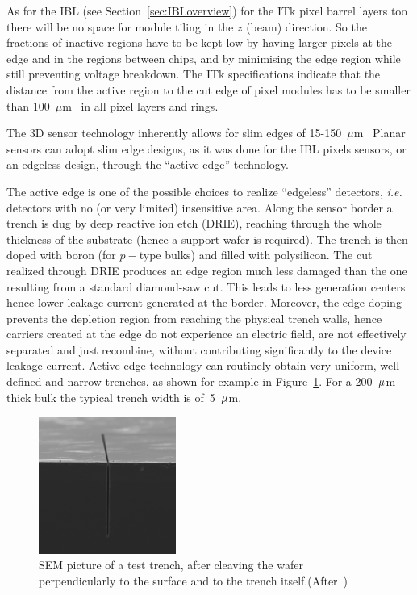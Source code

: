 As for the IBL (see Section~\ref{sec:IBLoverview}) for the ITk pixel barrel layers too there will be no 
space for module tiling in the $z$ (beam) direction. So the fractions of inactive regions have to be kept 
low by having larger pixels at the edge and in the regions between chips, and by minimising the edge 
region while still preventing voltage breakdown. 
 The ITk specifications indicate that the distance from the active region to the cut edge of pixel modules has to be smaller than 100~$\mu$m~\cite{ITkStripsTDR} in all pixel layers and rings.



The 3D sensor technology inherently allows for slim edges of 15-150~$\mu$m~\cite{1748-0221-10-03-C03031} 
Planar sensors can adopt slim edge designs, as it was done for the IBL pixels sensors, or 
an edgeless design, through the ``active edge'' technology.


The active edge is one of the possible choices to realize ``edgeless'' detectors, {\it i.e.} detectors with no (or very limited) insensitive area. Along the sensor border a trench is dug by deep reactive ion etch (DRIE), reaching through the whole thickness of the substrate (hence a support wafer is required).  The  trench is then doped with boron (for $p-$type bulks) and  filled with polysilicon. The cut realized through DRIE produces an edge region
much less damaged than the one resulting from a standard diamond-saw cut. This leads to less generation centers hence lower leakage current generated at the border. Moreover, the edge doping prevents the depletion region from reaching the physical trench walls, hence carriers created at the edge  do not experience an electric field, are not effectively separated and just recombine, without contributing significantly to the device leakage current.
Active edge technology can routinely obtain very uniform, well defined and narrow trenches, as shown for example in Figure~\ref{fig:trench}. For a 200~${\rm \mu}$m thick bulk the typical trench width is of~5~${\rm \mu}$m.

\begin{figure}[!htpb]
\begin{center}
\includegraphics[width=0.40\textwidth]{trench.pdf}
\caption{\label{fig:trench}SEM picture of  a test trench, after cleaving the wafer perpendicularly to the surface and to the trench itself.(After~\cite{bib:nim2012})}
\end{center}
\end{figure}


